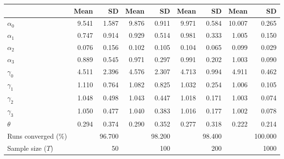 
\begin{tabular}[t]{lrrrrrrrr}
\toprule
  & Mean & SD & Mean  & SD  & Mean   & SD   & Mean    & SD   \\
\midrule
$\alpha_{0}$ & 9.541 & 1.587 & 9.876 & 0.911 & 9.971 & 0.584 & 10.007 & 0.265\\
$\alpha_{1}$ & 0.747 & 0.914 & 0.929 & 0.514 & 0.981 & 0.333 & 1.005 & 0.150\\
$\alpha_{2}$ & 0.076 & 0.156 & 0.102 & 0.105 & 0.104 & 0.065 & 0.099 & 0.029\\
$\alpha_{3}$ & 0.889 & 0.545 & 0.971 & 0.297 & 0.991 & 0.202 & 1.003 & 0.090\\
$\gamma_{0}$ & 4.511 & 2.396 & 4.576 & 2.307 & 4.713 & 0.994 & 4.911 & 0.462\\
$\gamma_{1}$ & 1.110 & 0.764 & 1.082 & 0.825 & 1.032 & 0.254 & 1.006 & 0.105\\
$\gamma_{2}$ & 1.048 & 0.498 & 1.043 & 0.447 & 1.018 & 0.171 & 1.003 & 0.074\\
$\gamma_{3}$ & 1.050 & 0.477 & 1.040 & 0.383 & 1.016 & 0.177 & 1.002 & 0.078\\
$\theta$ & 0.294 & 0.374 & 0.290 & 0.352 & 0.277 & 0.318 & 0.222 & 0.214\\
Runs converged (\%) &  & 96.700 &  & 98.200 &  & 98.400 &  & 100.000\\
Sample size ($T$) &  & 50 &  & 100 &  & 200 &  & 1000\\
\bottomrule
\end{tabular}
